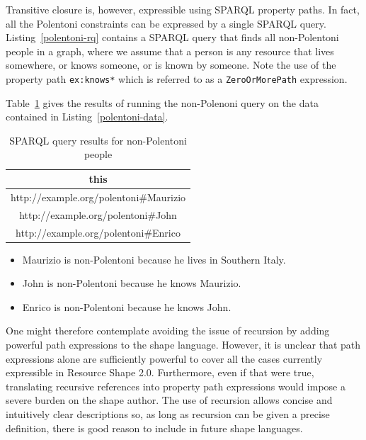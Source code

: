 \documentclass{article}
\begin{document}
Transitive closure is, however, expressible using SPARQL property paths.
In fact, all the Polentoni constraints can be expressed by a single SPARQL query.
Listing~\ref{polentoni-rq} contains a SPARQL query that finds all non-Polentoni people in a graph,
where we assume that a person is any resource that lives somewhere, or knows someone, or is known by someone.
Note the use of the property path {\tt ex:knows*} which is referred to as a {\tt ZeroOrMorePath} expression.


Table~\ref{polentoni-results} gives the results of running the non-Polenoni query on the data contained in Listing~\ref{polentoni-data}.
\begin{table}[h]
\begin{center}
\begin{tt}
\begin{tabular}{|c|}
\hline
this \\
\hline
http://example.org/polentoni\#Maurizio \\
http://example.org/polentoni\#John \\
http://example.org/polentoni\#Enrico \\
\hline
\end{tabular}
\end{tt}
\end{center}
\caption{SPARQL query results for non-Polentoni people}
\label{polentoni-results}
\end{table}
\begin{itemize}
\item Maurizio is non-Polentoni because he lives in Southern Italy.
\item John is non-Polentoni because he knows Maurizio.
\item Enrico is non-Polentoni because he knows John.
\end{itemize}

One might therefore contemplate avoiding the issue of recursion by adding powerful path expressions to the shape language.
However, it is unclear that path expressions alone are sufficiently powerful to cover all the cases currently expressible in Resource Shape 2.0.
Furthermore, even if that were true, translating recursive references into property path expressions would impose a severe burden on the shape author.
The use of recursion allows concise and intuitively clear descriptions so, as long as recursion can be given a precise definition, 
there is good reason to include in future shape languages.
\end{document}

